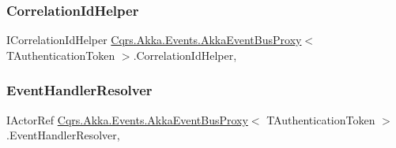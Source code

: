 \subsubsection{\texorpdfstring{Correlation\+Id\+Helper}{CorrelationIdHelper}}
{\footnotesize\ttfamily I\+Correlation\+Id\+Helper \hyperlink{classCqrs_1_1Akka_1_1Events_1_1AkkaEventBusProxy}{Cqrs.\+Akka.\+Events.\+Akka\+Event\+Bus\+Proxy}$<$ T\+Authentication\+Token $>$.Correlation\+Id\+Helper\hspace{0.3cm}{\ttfamily [get]}, {\ttfamily [protected]}}

\mbox{\label{classCqrs_1_1Akka_1_1Events_1_1AkkaEventBusProxy_abd36f5db7a03a38d573b11c0d6f37117}} 
\subsubsection{\texorpdfstring{Event\+Handler\+Resolver}{EventHandlerResolver}}
{\footnotesize\ttfamily I\+Actor\+Ref \hyperlink{classCqrs_1_1Akka_1_1Events_1_1AkkaEventBusProxy}{Cqrs.\+Akka.\+Events.\+Akka\+Event\+Bus\+Proxy}$<$ T\+Authentication\+Token $>$.Event\+Handler\+Resolver\hspace{0.3cm}{\ttfamily [get]}, {\ttfamily [protected]}}

